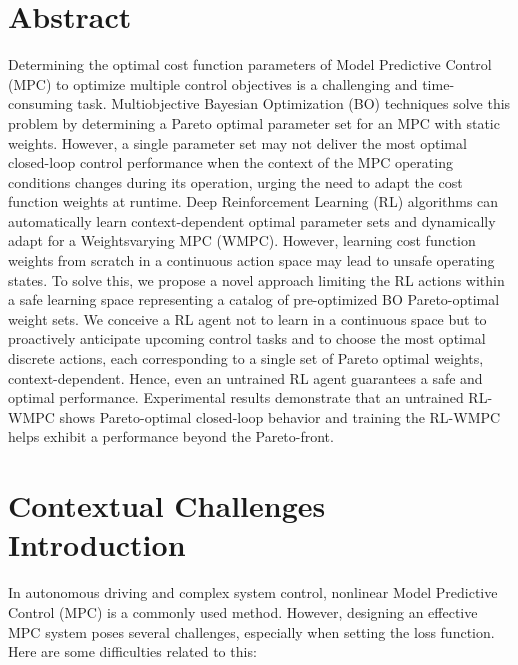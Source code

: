 
%
%
		
    
\section{Abstract}
Determining the optimal cost function parameters of Model Predictive Control (MPC) to optimize multiple control objectives is a challenging and time-consuming task. Multiobjective Bayesian Optimization (BO) techniques solve this problem by determining a Pareto optimal parameter set for an MPC with static weights. However, a single parameter set may not deliver the most optimal closed-loop control performance when the context of the MPC operating conditions changes during its operation, urging the need to adapt the cost function weights at runtime. Deep Reinforcement Learning (RL) algorithms can automatically learn context-dependent optimal parameter sets and dynamically adapt for a Weightsvarying MPC (WMPC). However, learning cost function weights from scratch in a continuous action space may lead to unsafe operating states. To solve this, we propose a novel approach limiting the RL actions within a safe learning space representing a catalog of pre-optimized BO Pareto-optimal weight sets. We conceive a RL agent not to learn in a continuous space but to proactively anticipate upcoming control tasks and to choose the most optimal discrete actions, each corresponding to a single set of Pareto optimal weights, context-dependent. Hence, even an untrained RL agent guarantees a safe and optimal performance. Experimental results demonstrate that an untrained RL-WMPC shows Pareto-optimal closed-loop behavior and training the RL-WMPC helps exhibit a performance beyond the Pareto-front.
\section{Contextual Challenges Introduction}
	In autonomous driving and complex system control, nonlinear Model Predictive Control (MPC) is a commonly used method. However, designing an effective MPC system poses several challenges, especially when setting the loss function. Here are some difficulties related to this:
